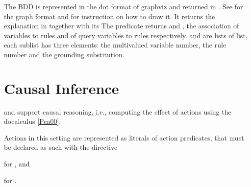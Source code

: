 \documentclass[letterpaper,10pt,english]{sphinxmanual}
\begin{document}
\sphinxAtStartPar
The BDD is represented in the dot format of graphviz and returned in . See {\hyperref[\detokenize{index:drawing-bdds}]{}}
for the graph format and for instruction on how to draw it.
It returns the explanation in  together with its 
The predicate returns  and , the association of variables to rules
and of query variables to rules respectively.
 and  are lists of list, each sublist has three elements:
the multivalued variable number,
the rule number and the grounding substitution.


\section{Causal Inference}
\label{\detokenize{index:causal-inference}}
\sphinxAtStartPar
{} and  support causal reasoning, i.e., computing the effect of actions using the do\sphinxhyphen{}calculus {[}\hyperlink{cite.index:id57}{Pea00}{]}.

\sphinxAtStartPar
Actions in this setting are represented as literals of action predicates, that must be declared as such with the directive

\begin{sphinxVerbatim}[commandchars=\\\{\}]
  
\end{sphinxVerbatim}

\sphinxAtStartPar
for , and

\begin{sphinxVerbatim}[commandchars=\\\{\}]
  
\end{sphinxVerbatim}

\sphinxAtStartPar
for .
\end{document}
